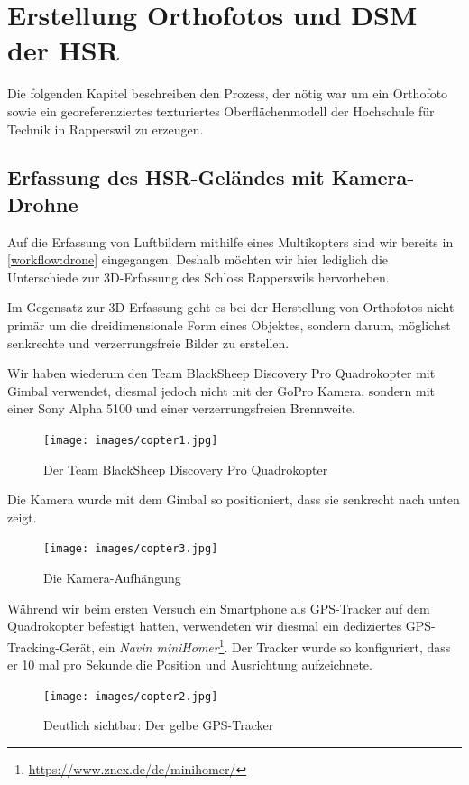 \chapter{Erstellung Orthofotos und DSM der HSR}


Die folgenden Kapitel beschreiben den Prozess, der nötig war um ein Orthofoto
sowie ein georeferenziertes texturiertes Oberflächenmodell der Hochschule für
Technik in Rapperswil zu erzeugen.


\section{Erfassung des HSR-Geländes mit Kamera-Drohne}

\label{workflow:hsr:drone}

Auf die Erfassung von Luftbildern mithilfe eines Multikopters sind wir bereits
in \autoref{workflow:drone} eingegangen. Deshalb möchten wir hier lediglich die
Unterschiede zur 3D-Erfassung des Schloss Rapperswils hervorheben.

Im Gegensatz zur 3D-Erfassung geht es bei der Herstellung von Orthofotos nicht
primär um die dreidimensionale Form eines Objektes, sondern darum, möglichst
senkrechte und verzerrungsfreie Bilder zu erstellen.

Wir haben wiederum den Team BlackSheep Discovery Pro Quadrokopter mit Gimbal
verwendet, diesmal jedoch nicht mit der GoPro Kamera, sondern mit einer Sony
Alpha 5100 und einer verzerrungsfreien Brennweite.
\begin{figure}[H]
	\centering
	\texttt{[image: images/copter1.jpg]}
	\caption{Der Team BlackSheep Discovery Pro Quadrokopter}
	\label{img:copter1}
\end{figure}

\noindent Die Kamera wurde mit dem Gimbal so positioniert, dass sie senkrecht
nach unten zeigt.
\begin{figure}[H]
	\centering
	\texttt{[image: images/copter3.jpg]}
	\caption{Die Kamera-Aufhängung}
	\label{img:copter3}
\end{figure}

\noindent Während wir beim ersten Versuch ein Smartphone als GPS-Tracker auf dem
Quadrokopter befestigt hatten, verwendeten wir diesmal ein dediziertes
GPS-Tracking-Gerät, ein \textit{Navin
miniHomer}\footnote{\url{https://www.znex.de/de/minihomer/}}. Der Tracker wurde
so konfiguriert, dass er 10 mal pro Sekunde die Position und Ausrichtung
aufzeichnete.
\begin{figure}[H]
	\centering
	\texttt{[image: images/copter2.jpg]}
	\caption{Deutlich sichtbar: Der gelbe GPS-Tracker}
	\label{img:copter2}
\end{figure}

